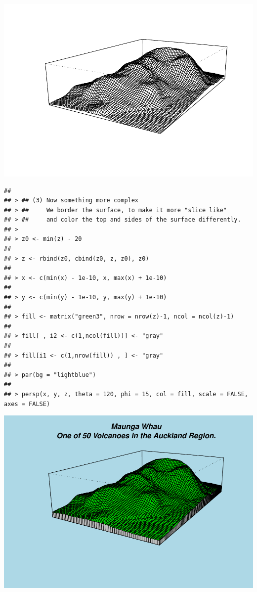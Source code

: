 \documentclass[]{book}
\begin{document}
\includegraphics{TudodoR_files/figure-latex/unnamed-chunk-146-3.pdf}

\begin{verbatim}
## 
## > ## (3) Now something more complex
## > ##     We border the surface, to make it more "slice like"
## > ##     and color the top and sides of the surface differently.
## > 
## > z0 <- min(z) - 20
## 
## > z <- rbind(z0, cbind(z0, z, z0), z0)
## 
## > x <- c(min(x) - 1e-10, x, max(x) + 1e-10)
## 
## > y <- c(min(y) - 1e-10, y, max(y) + 1e-10)
## 
## > fill <- matrix("green3", nrow = nrow(z)-1, ncol = ncol(z)-1)
## 
## > fill[ , i2 <- c(1,ncol(fill))] <- "gray"
## 
## > fill[i1 <- c(1,nrow(fill)) , ] <- "gray"
## 
## > par(bg = "lightblue")
## 
## > persp(x, y, z, theta = 120, phi = 15, col = fill, scale = FALSE, axes = FALSE)
\end{verbatim}

\includegraphics{TudodoR_files/figure-latex/unnamed-chunk-146-4.pdf}
\end{document}
